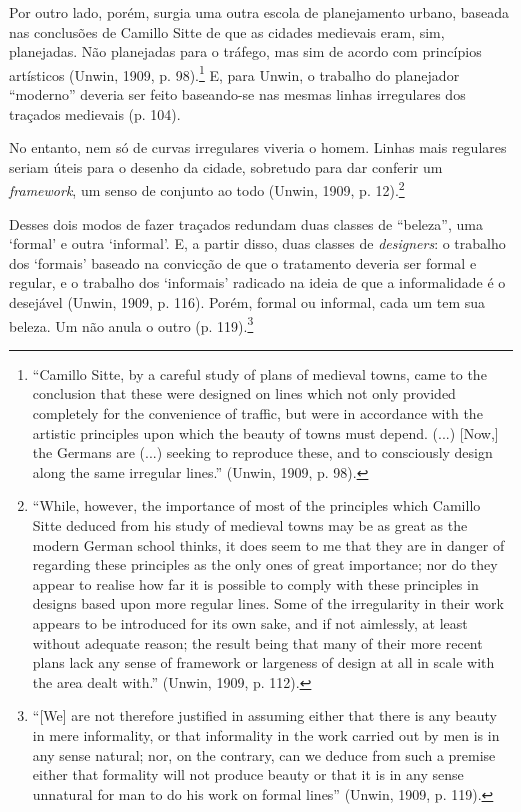\documentclass[12pt, a4paper]{book} %
\begin{document}
        Por outro lado, porém, surgia uma outra escola de planejamento urbano, baseada nas conclusões de Camillo Sitte de que as cidades medievais eram, sim, planejadas. Não planejadas para o tráfego, mas sim de acordo com princípios artísticos (Unwin, 1909, p. 98).\footnote[9]{``Camillo Sitte, by a careful study of plans of medieval towns, came to the conclusion that these were designed on lines which not only provided completely for the convenience of traffic, but were in accordance with the artistic principles upon which the beauty of towns must depend. (...) [Now,] the Germans are (...) seeking to reproduce these, and to consciously design along the same irregular lines.'' (Unwin, 1909, p. 98).} E, para Unwin, o trabalho do planejador ``moderno'' deveria ser feito baseando-se nas mesmas linhas irregulares dos traçados medievais (p. 104).
        
        No entanto, nem só de curvas irregulares viveria o homem. Linhas mais regulares seriam úteis para o desenho da cidade, sobretudo para dar conferir um \textit{framework}, um senso de conjunto ao todo (Unwin, 1909, p. 12).\footnote[10]{``While, however, the importance of most of the principles which Camillo Sitte deduced from his study of medieval towns may be as great as the modern German school thinks, it does seem to me that they are in danger of regarding these principles as the only ones of great importance; nor do they appear to realise how far it is possible to comply with these principles in designs based upon more regular lines. Some of the irregularity in their work appears to be introduced for its own sake, and if not aimlessly, at least without adequate reason; the result being that many of their more recent plans lack any sense of framework or largeness of design at all in scale with the area dealt with.'' (Unwin, 1909, p. 112).}
        
        Desses dois modos de fazer traçados redundam duas classes de ``beleza'', uma `formal' e outra `informal'. E, a partir disso, duas classes de \textit{designers}: o trabalho dos `formais' baseado na convicção de que o tratamento deveria ser formal e regular, e o trabalho dos `informais' radicado na ideia de que a informalidade é o desejável (Unwin, 1909, p. 116). Porém, formal ou informal, cada um tem sua beleza. Um não anula o outro (p. 119).\footnote[11]{``[We] are not therefore justified in assuming either that there is any beauty in mere informality, or that informality in the work carried out by men is in any sense natural; nor, on the contrary, can we deduce from such a premise either that formality will not produce beauty or that it is in any sense unnatural for man to do his work on formal lines'' (Unwin, 1909, p. 119).}
\end{document}
